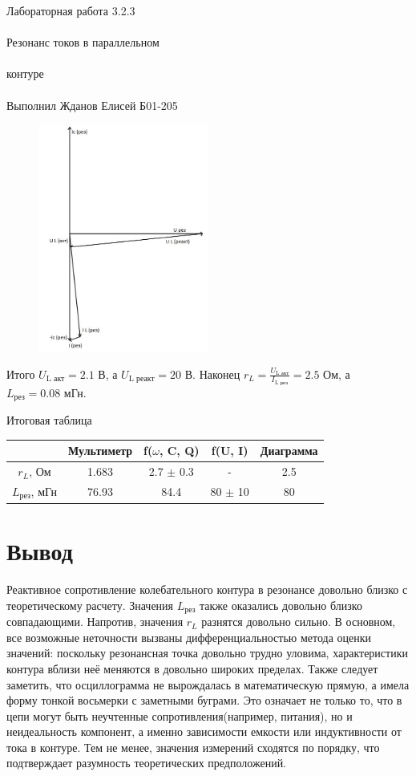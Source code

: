 \documentclass{astroedu-lab}
\begin{document}
\begin{problem}{\huge Лабораторная работа 3.2.3\\\\Резонанс токов в параллельном\\\\контуре\\\\Выполнил Жданов Елисей Б01-205}
\begin{figure}[!h]
	\centering
	\includegraphics[width=0.5\textwidth]{vector.jpg}
	\label{fig:boiler}
\end{figure}

Итого $U_\text{L акт} = 2.1 \text{ В}$, а $U_\text{L реакт} = 20 \text{ В}$. Наконец $r_L = \frac{U_\text{L акт}}{I_\text{L рез}} = 2.5 \text{ Ом}$, а $L_{\text{рез}} = 0.08 \text{ мГн}$.

Итоговая таблица

\begin{center}
\begin{tabular}{|c|c|c|c|c|}
\hline 
& Мультиметр & f($\omega$, C, Q) & f(U, I) & Диаграмма \\
\hline 
$r_L$, Ом			& 1.683 & 2.7 $\pm$ 0.3	& - & 2.5\\
\hline
$L_\text{рез}$, мГн	& 76.93	& 84.4 & 80 $\pm$ 10 & 80\\
\hline
\end{tabular}
\end{center}

\section{Вывод}

Реактивное сопротивление колебательного контура в резонансе довольно близко с теоретическому расчету. Значения $L_\text{рез}$ также оказались довольно близко совпадающими. Напротив, значения $r_L$ разнятся довольно сильно. В основном, все возможные неточности вызваны дифференциальностью метода оценки значений: поскольку резонансная точка довольно трудно уловима, характеристики контура вблизи неё меняются в довольно широких пределах. Также следует заметить, что осциллограмма не вырождалась в математическую прямую, а имела форму тонкой восьмерки с заметными буграми. Это означает не только то, что в цепи могут быть неучтенные сопротивления(например, питания), но и неидеальность компонент, а именно зависимости емкости или индуктивности от тока в контуре. Тем не менее, значения измерений сходятся по порядку, что подтверждает разумность теоретических предположений.


\end{problem}
\end{document}
